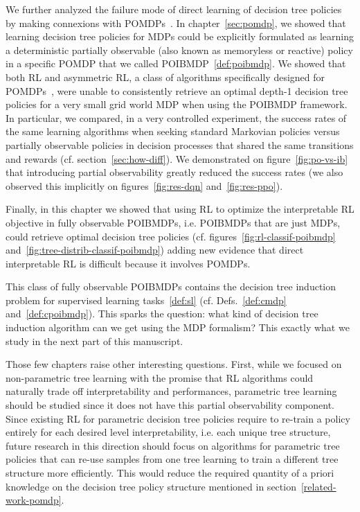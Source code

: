 We further analyzed the failure mode of direct learning of decision tree policies by making connexions with POMDPs~\cite{POMDP,chap2}.
In chapter~\ref{sec:pomdp}, we showed that learning decision tree policies for MDPs could be explicitly formulated as learning a deterministic partially observable (also known as memoryless or reactive) policy in a specific POMDP that we called POIBMDP~\ref{def:poibmdp}.
We showed that both RL and asymmetric RL, a class of algorithms specifically designed for POMDPs~\cite{baisero-ppo,baisero-dqn}, were unable to consistently retrieve an optimal depth-1 decision tree policies for a very small grid world MDP when using the POIBMDP framework.
In particular, we compared, in a very controlled experiment, the success rates of the same learning algorithms when seeking standard Markovian policies versus partially observable policies in decision processes that shared the same transitions and rewards (cf. section~\ref{sec:how-diff}).
We demonstrated on figure~\ref{fig:po-vs-ib} that introducing partial observability greatly reduced the success rates (we also observed this implicitly on figures~\ref{fig:res-dqn} and~\ref{fig:res-ppo}).  

Finally, in this chapter we showed that using RL to optimize the interpretable RL objective in fully observable POIBMDPs, i.e. POIBMDPs that are just MDPs, could retrieve optimal decision tree policies (cf. figures~\ref{fig:rl-classif-poibmdp} and~\ref{fig:tree-distrib-classif-poibmdp}) adding new evidence that direct interpretable RL is difficult because it involves POMDPs.

This class of fully observable POIBMDPs contains the decision tree induction problem for supervised learning tasks~\ref{def:sl} (cf. Defs.~\ref{def:cmdp} and~\ref{def:cpoibmdp}).
This sparks the question: what kind of decision tree induction algorithm can we get using the MDP formalism?
This exactly what we study in the next part of this manuscript.

Those few chapters raise other interesting questions.
First, while we focused on non-parametric tree learning with the promise that RL algorithms could naturally trade off interpretability and performances, parametric tree learning should be studied since it does not have this partial observability component.
Since existing RL for parametric decision tree policies \cite{silva,vos2024optimizinginterpretabledecisiontree,sympol} require to re-train a policy entirely for each desired level interpretability, i.e. each unique tree structure, future research in this direction should focus on algorithms for parametric tree policies that can re-use samples from one tree learning to train a different tree structure more efficiently.
This would reduce the required quantity of a priori knowledge on the decision tree policy structure mentioned in section~\ref{related-work-pomdp}.

